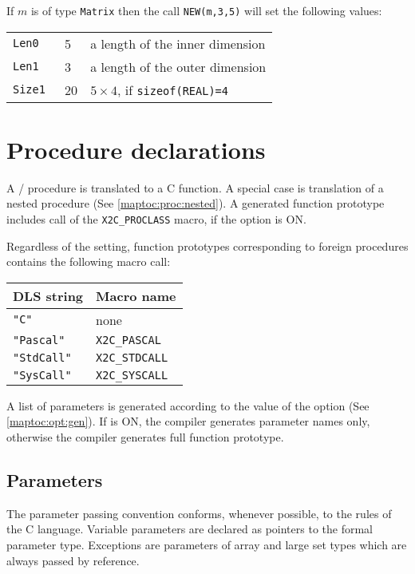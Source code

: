 If $m$ is of type {\tt Matrix} then the call {\tt NEW(m,3,5)}
will set the following values:
\begin{flushleft}
\begin{tabular}{lll}
\tt Len0  & 5 & a length of the inner dimension \\
\tt Len1  & 3 & a length of the outer dimension \\
\tt Size1 & 20 & $5\times4$, if {\tt sizeof(REAL)=4} \\
\end{tabular}
\end{flushleft}

\section{Procedure declarations}\label{maptoc:proc}

A \mt{}/\ot{} procedure is translated to a C function. A special case
is translation of a nested procedure (See \ref{maptoc:proc:nested}).  A
generated function prototype includes call of the \verb|X2C_PROCLASS|
macro, if the  option is ON.

Regardless of the  setting, function prototypes
corresponding to foreign procedures contains the following macro
call:

\begin{flushleft}
\begin{tabular}{l|l}
\bf DLS string & \bf Macro name   \\
\hline
\tt "C"        & none             \\
\tt "Pascal"   & \tt X2C\_PASCAL  \\
\tt "StdCall"  & \tt X2C\_STDCALL \\
\tt "SysCall"  & \tt X2C\_SYSCALL
\end{tabular}
\end{flushleft}

A list of parameters is generated according to the value of the
 option (See \ref{maptoc:opt:gen}).
If  is ON, the compiler generates
parameter names only, otherwise the compiler generates full function
prototype.

\subsection{Parameters}

The parameter passing convention conforms, whenever possible, to
the rules of the C language. Variable parameters are
declared as pointers to the formal parameter type. Exceptions are
parameters of array and large set types which are always passed by
reference.

